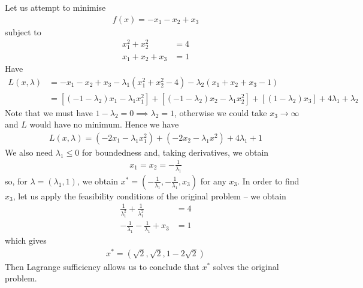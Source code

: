 \documentclass{../template/note}
\begin{document}
    \begin{example*}
        Let us attempt to minimise
        \begin{align*}
            f(x) =-x_1-x_2+x_3
        \end{align*}
        subject to
        \begin{align*}
            x_1^2 + x_2^2 &= 4 \\
            x_1+x_2+x_3 &= 1
        \end{align*}
        Have
        \begin{align*}
            L(x, \lambda) &= -x_1-x_2+x_3 - \lambda_1(x_1^2+x_2^2-4)-\lambda_2(x_1+x_2+x_3-1) \\
            &= [(-1-\lambda_2)x_1 - \lambda_1x_1^2] + [(-1-\lambda_2)x_2-\lambda_1x_2^2] + [(1-\lambda_2)x_3] + 4\lambda_1 + \lambda_2
        \end{align*}
        Note that we must have $1-\lambda_2 = 0 \implies \lambda_2 = 1$, otherwise we could take $x_3 \to \infty$ and $L$ would have no minimum. Hence we have
        \begin{align*}
            L(x, \lambda) = (-2x_1-\lambda_1x_1^2) + (-2x_2-\lambda_1x^2) + 4\lambda_1+1
        \end{align*}
        We also need $\lambda_1 \leq 0$ for boundedness and, taking derivatives, we obtain
        \begin{align*}
            x_1 = x_2 = -\frac 1 {\lambda_1}
        \end{align*}
        so, for $\lambda = (\lambda_1, 1)$, we obtain $x^* = (-\frac 1 {\lambda_1}, -\frac 1{\lambda_1}, x_3)$ for any $x_3$. In order to find $x_3$, let us apply the feasibility conditions of the original problem -- we obtain
        \begin{align*}
            \frac 1 {\lambda_1^2} + \frac 1 {\lambda_1^2} &= 4 \\
            -\frac 1{\lambda_1} - \frac 1{\lambda_1} + x_3 &= 1
        \end{align*}
        which gives
        \begin{align*}
            x^* = (\sqrt 2, \sqrt 2, 1-2\sqrt 2)
        \end{align*}
        Then Lagrange sufficiency allows us to conclude that $x^*$ solves the original problem.       
    \end{example*}
    
\end{document}
